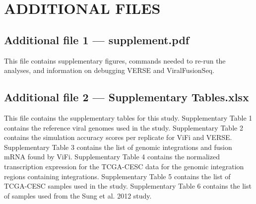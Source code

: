 \documentclass[a4,center,fleqn]{NAR}
\begin{document}

\section{ADDITIONAL FILES}
  \subsection*{\textbf{Additional file 1} --- supplement.pdf}
    This file contains supplementary figures, commands needed to re-run the analyses, and information on 
    debugging VERSE and ViralFusionSeq.
    
  \subsection*{\textbf{Additional file 2} --- Supplementary Tables.xlsx}
    This file contains the supplementary tables for this study.  Supplementary Table 1 contains the reference viral genomes used in the study.  Supplementary Table 2 contains the simulation accuracy scores per replicate for ViFi and VERSE.  Supplementary Table 3 contains the list of genomic integrations and fusion mRNA found by ViFi.  Supplementary Table 4 contains the normalized transcription expression for the TCGA-CESC data for the genomic integration regions containing integrations.  Supplementary Table 5 contains the list of TCGA-CESC samples used in the study.  Supplementary Table 6 contains the list of samples used from the Sung et al. 2012 study.
\end{document}

